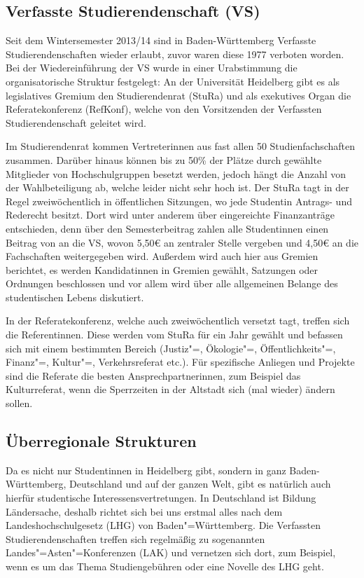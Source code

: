 \vspace{-2mm}
\subsection{Verfasste Studierendenschaft (VS)}
Seit dem Wintersemester 2013/14 sind in Baden-Württemberg Verfasste Studierendenschaften wieder erlaubt, zuvor waren diese 1977 verboten worden.
Bei der Wiedereinführung der VS wurde in einer Urabstimmung die organisatorische Struktur festgelegt:
An der Universität Heidelberg gibt es als legislatives Gremium den Studierendenrat (StuRa) und als exekutives Organ die Referatekonferenz (RefKonf), welche von den Vorsitzenden der Verfassten Studierendenschaft geleitet wird.

Im Studierendenrat kommen Vertreterinnen aus fast allen 50 Studienfachschaften zusammen.
Darüber hinaus können bis zu 50\% der Plätze durch gewählte Mitglieder von Hochschulgruppen besetzt werden, jedoch hängt die Anzahl von der Wahlbeteiligung ab, welche leider nicht sehr hoch ist.
Der StuRa tagt in der Regel zweiwöchentlich in öffentlichen Sitzungen, wo jede Studentin Antrags- und Rederecht besitzt.
Dort wird unter anderem über eingereichte Finanzanträge entschieden, denn über den Semesterbeitrag zahlen alle Studentinnen einen Beitrag von \EUR{\vsbeitrag} an die VS, wovon 5,50€ an zentraler Stelle vergeben und 4,50€ an die Fachschaften weitergegeben wird.
Außerdem wird auch hier aus Gremien berichtet, es werden Kandidatinnen in Gremien gewählt, Satzungen oder Ordnungen beschlossen und vor allem wird über alle allgemeinen Belange des studentischen Lebens diskutiert.

In der Referatekonferenz, welche auch zweiwöchentlich versetzt tagt, treffen sich die Referentinnen.
Diese werden vom StuRa für ein Jahr gewählt und befassen sich mit einem bestimmten Bereich (Justiz"=, Ökologie"=, Öffentlichkeits"=, Finanz"=, Kultur"=, Verkehrsreferat etc.).
Für spezifische Anliegen und Projekte sind die Referate die besten Ansprechpartnerinnen, zum Beispiel das Kulturreferat, wenn die Sperrzeiten in der Altstadt sich (mal wieder) ändern sollen.

\subsection{Überregionale Strukturen}
Da es nicht nur Studentinnen in Heidelberg gibt, sondern in ganz Baden-Württemberg, Deutschland und auf der ganzen Welt, gibt es natürlich auch hierfür studentische Interessensvertretungen.
In Deutschland ist Bildung Ländersache, deshalb richtet sich bei uns erstmal alles nach dem Landeshochschulgesetz (LHG) von Baden"=Württemberg.
Die Verfassten Studierendenschaften treffen sich regelmäßig zu sogenannten Landes"=Asten"=Konferenzen (LAK) und vernetzen sich dort, zum Beispiel, wenn es um das Thema Studiengebühren oder eine Novelle des LHG geht.

